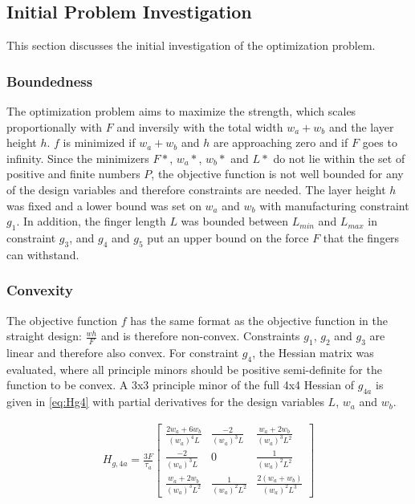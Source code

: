 \subsection{Initial Problem Investigation}
This section discusses the initial investigation of the optimization problem. 

\subsubsection{Boundedness}
The optimization problem aims to maximize the strength, which scales proportionally with $F$ and inversily with the total width $w_a + w_b$ and the layer height $h$.  $f$ is minimized if $w_a + w_b$ and $h$ are approaching zero and if $F$ goes to infinity. Since the minimizers $F*$, $w_a*$, $w_b*$ and $L*$ do not lie within the set of positive and finite numbers $P$, the objective function is not well bounded for any of the design variables and therefore constraints are needed. The layer height $h$ was fixed and a lower bound was set on $w_a$ and $w_b$ with manufacturing constraint $g_1$. In addition, the finger length $L$ was bounded between $L_{min}$ and $L_{max}$ in constraint $g_3$, and $g_4$ and $g_5$ put an upper bound on the force $F$ that the fingers can withstand. 

\subsubsection{Convexity}
The objective function $f$ has the same format as the objective function in the straight design: $\frac{w  h}{F}$ and is therefore non-convex.
 Constraints $g_1$, $g_2$ and $g_3$ are linear and therefore also convex. For constraint $g_4$, the Hessian matrix was evaluated, where all principle minors should be positive semi-definite for the function to be convex. A 3x3 principle minor of the full 4x4 Hessian of $g_{4a}$ is given in \autoref{eq:Hg4} with partial derivatives for the design variables $L$, $w_a$ and $w_b$.

\begin{align}
	\label{eq:Hg4}
	H_{g,4a}= \frac{3F}{\tau_a}\begin{bmatrix}
		\frac{2w_a + 6 w_b}{\left( w_a \right)^4 L} & \frac{-2}{\left( w_a \right)^3 L } &  \frac{w_a + 2 w_b}{\left( w_a \right)^3 L^2 }\\
		\frac{-2}{\left( w_a \right)^3 L } & 0 & \frac{1}{\left( w_a \right)^2 L^2 }  \\
\frac{w_a + 2 w_b}{\left( w_a \right)^3 L^2 } & \frac{1}{\left( w_a \right)^2 L^2 } & \frac{2 \left(w_a + w_b\right)}{\left( w_a \right)^2 L^3}													
	\end{bmatrix}
\end{align}

